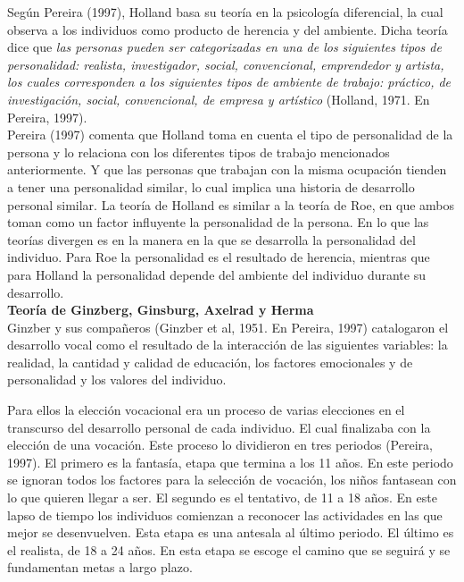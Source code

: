 	Según Pereira (1997), Holland basa su teoría en la psicología diferencial, la cual observa a los individuos como producto de herencia y del ambiente. Dicha teoría dice que \textit{las personas pueden ser categorizadas en una de los siguientes tipos de personalidad: realista, investigador, social, convencional, emprendedor y artista, los cuales corresponden a los siguientes tipos de ambiente de trabajo: práctico, de investigación, social, convencional, de empresa y artístico} (Holland, 1971. En Pereira, 1997).\\
	
	Pereira (1997) comenta que Holland toma en cuenta el tipo de personalidad de la persona y lo relaciona con los diferentes tipos de trabajo mencionados anteriormente. Y que las personas que trabajan con la misma ocupación tienden a tener una personalidad similar, lo cual implica una historia de desarrollo personal similar.
	La teoría de Holland es similar a la teoría de Roe, en que ambos toman como un factor influyente la personalidad de la persona. En lo que las teorías divergen es en la manera en la que se desarrolla la personalidad del individuo. Para Roe la personalidad es el resultado de herencia, mientras que para Holland la personalidad depende del ambiente del individuo durante su desarrollo.\\
	
	\textbf{Teoría de Ginzberg, Ginsburg, Axelrad y Herma}\\
	
	Ginzber y sus compañeros (Ginzber et al, 1951. En Pereira, 1997) catalogaron el desarrollo vocal como el resultado de la interacción de las siguientes variables: la realidad, la cantidad y calidad de educación, los factores emocionales y de personalidad y los valores del individuo.
	
	Para ellos la elección vocacional era un proceso de varias elecciones en el transcurso del desarrollo personal de cada individuo. El cual finalizaba con la elección de una vocación. Este proceso lo dividieron en tres periodos (Pereira, 1997). El primero es la fantasía, etapa que termina a los 11 años. En este periodo se ignoran todos los factores para la selección de vocación, los niños fantasean con lo que quieren llegar a ser. El segundo es el tentativo, de 11 a 18 años. En este lapso de tiempo los individuos comienzan a reconocer las actividades en las que mejor se desenvuelven. Esta etapa es una antesala al último periodo. El último es el realista, de 18 a 24 años. En esta etapa se escoge el camino que se seguirá y se fundamentan metas a largo plazo.
	

